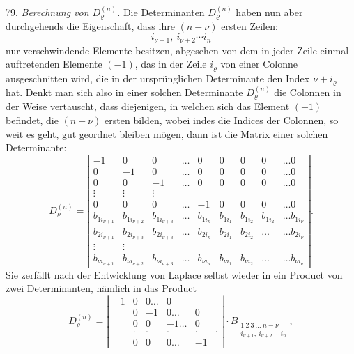 \documentclass[11pt]{article}
\begin{document}
79. \textit{Berechnung von $D_\varrho^{(n)}$.} Die Determinanten $D_\varrho^{(n)}$
haben nun aber durchgehends die Eigenschaft, dass ihre $(n-\nu)$ ersten
Zeilen:
\[
i_{\nu+1},\ i_{\nu+2}\cdots i_n
\]
nur verschwindende Elemente besitzen, abgesehen von dem in jeder Zeile
einmal auftretenden Elemente $(-1)$, das in der Zeile $i_\varrho$ von
einer Colonne ausgeschnitten wird, die in der urspr\"unglichen Determinante
den Index $\nu+i_\varrho$ hat. Denkt man sich also in einer solchen
Determinante $D_\varrho^{(n)}$ die Colonnen in der Weise vertauscht, dass
diejenigen, in welchen sich das Element $(-1)$ befindet, die $(n-\nu)$
ersten bilden, wobei indes die Indices der Colonnen, so weit es geht, gut
geordnet bleiben m\"ogen, dann ist die Matrix einer solchen Determinante:
\[
D_\varrho^{(n)}=
\left|\begin{array}{ccccccccc}
-1 & 0 & 0 & \ldots & 0 & 0 & 0 & 0 & \ldots 0\\
0 & -1 & 0 & \ldots & 0 & 0 & 0 & 0 & \ldots 0\\
0 & 0 & -1 & \ldots & 0 & 0 & 0 & 0 & \ldots 0\\
\vdots & \vdots & \vdots & & & & & &\\
0 & 0 & 0 & \ldots & -1 & 0 & 0 & 0 & \ldots 0\\
b_{1i_{\nu+1}} & b_{1i_{\nu+2}} & b_{1i_{\nu+3}} & \ldots & b_{1i_n} & b_{1i_1} & b_{1i_2} & b_{1i_2} & \ldots b_{1i_\nu}\\
b_{2i_{\nu+1}} & b_{2i_{\nu+3}} & b_{2i_{\nu+3}} & \ldots & b_{2i_n} & b_{2i_1} & b_{2i_2} & \ldots & \ldots b_{2i_\nu}\\
\vdots & \vdots & & & & & &\\
b_{\nu i_{\nu+1}} & b_{\nu i_{\nu+2}} & b_{\nu i_{\nu+3}} & \ldots & b_{\nu i_n} & b_{\nu i_1} & b_{\nu i_2} & \ldots & \ldots b_{\nu i_\nu}
\end{array}\right|.
\]
Sie zerf\"allt nach der Entwicklung von Laplace selbst wieder in ein
Product von zwei Determinanten, n\"amlich in das Product
\[
D_\varrho^{(n)}=
\left|\begin{array}{cccccc}
-1 & 0 & 0\ldots & 0\\
& 0 & -1 & 0\ldots & 0\\
& 0 & 0 & -1\ldots & 0\\
& \cdot & \cdot & \cdot & \cdot & \cdot\\
& 0 & 0 & 0\ldots & -1
\end{array}\right|
\cdot B_{\substack{1\ 2\ 3\ \ldots\ n-\nu\\i_{\nu+1},\ i_{\nu+2}\ \cdots\ i_n}}, \tag{D}
\]
\end{document}
